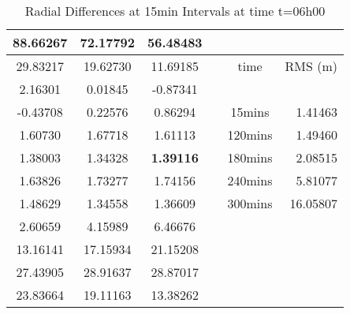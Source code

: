 \begin{table}[htbp]
  \centering
  \caption{Radial Differences at 15min Intervals at time t=06h00}
    \begin{tabular}{cccccr}
    \toprule
    88.66267 & 72.17792 & 56.48483 & \textbf{} & \textbf{} & \textbf{} \\
    \midrule
    29.83217 & 19.62730 & 11.69185 & \textbf{} & time  & \multicolumn{1}{c}{RMS (m)} \\
    2.16301 & 0.01845 & -0.87341 & \textbf{} &       &  \\
    -0.43708 & 0.22576 & 0.86294 & \textbf{} & 15mins & 1.41463 \\
    1.60730 & 1.67718 & 1.61113 & \textbf{} & 120mins & 1.49460 \\
    1.38003 & 1.34328 & \textbf{1.39116} & \textbf{} & 180mins & 2.08515 \\
    1.63826 & 1.73277 & 1.74156 & \textbf{} & 240mins & 5.81077 \\
    1.48629 & 1.34558 & 1.36609 & \textbf{} & 300mins & 16.05807 \\
    2.60659 & 4.15989 & 6.46676 & \textbf{} & \textbf{} & \textbf{} \\
    13.16141 & 17.15934 & 21.15208 & \textbf{} & \textbf{} & \textbf{} \\
    27.43905 & 28.91637 & 28.87017 & \textbf{} & \textbf{} & \textbf{} \\
    23.83664 & 19.11163 & 13.38262 & \textbf{} & \textbf{} & \textbf{} \\
    \bottomrule
    \end{tabular}%
  \label{tab:1}%
\end{table}%

